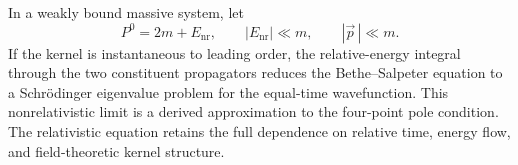 In a weakly bound massive system, let
\[
  P^0=2m+E_{\mathrm{nr}},
  \qquad |E_{\mathrm{nr}}|\ll m,
  \qquad |\vec p\,|\ll m .
\]
If the kernel is instantaneous to leading order, the relative-energy integral
through the two constituent propagators reduces the Bethe--Salpeter equation
to a Schrödinger eigenvalue problem for the equal-time wavefunction. This
nonrelativistic limit is a derived approximation to the four-point pole
condition. The relativistic equation retains the full dependence on relative
time, energy flow, and field-theoretic kernel structure.
